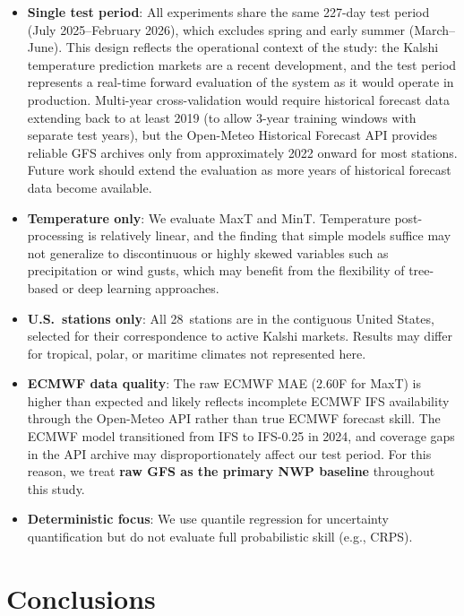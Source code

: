 \documentclass[12pt, letterpaper]{article}
\begin{document}
\begin{itemize}
  \item \textbf{Single test period}: All experiments share the same 227-day test
    period (July 2025--February 2026), which excludes spring and early summer
    (March--June). This design reflects the operational context of the study: the
    Kalshi temperature prediction markets are a recent development, and the test
    period represents a real-time forward evaluation of the system as it would
    operate in production. Multi-year cross-validation would require historical
    forecast data extending back to at least 2019 (to allow 3-year training windows
    with separate test years), but the Open-Meteo Historical Forecast API provides
    reliable GFS archives only from approximately 2022 onward for most stations.
    Future work should extend the evaluation as more years of historical forecast
    data become available.
  \item \textbf{Temperature only}: We evaluate MaxT and MinT. Temperature
    post-processing is relatively linear, and the finding that simple models suffice
    may not generalize to discontinuous or highly skewed variables such as
    precipitation or wind gusts, which may benefit from the flexibility of
    tree-based or deep learning approaches.
  \item \textbf{U.S.\ stations only}: All 28~stations are in the contiguous United
    States, selected for their correspondence to active Kalshi markets. Results may
    differ for tropical, polar, or maritime climates not represented here.
  \item \textbf{ECMWF data quality}: The raw ECMWF MAE (2.60\textdegree{}F for
    MaxT) is higher than expected and likely reflects incomplete ECMWF IFS
    availability through the Open-Meteo API rather than true ECMWF forecast skill.
    The ECMWF model transitioned from IFS to IFS-0.25\textdegree{} in 2024, and
    coverage gaps in the API archive may disproportionately affect our test period.
    For this reason, we treat \textbf{raw GFS as the primary NWP baseline}
    throughout this study.
  \item \textbf{Deterministic focus}: We use quantile regression for uncertainty
    quantification but do not evaluate full probabilistic skill (e.g., CRPS).
\end{itemize}

\section{Conclusions}
\label{sec:conclusions}
\end{document}
